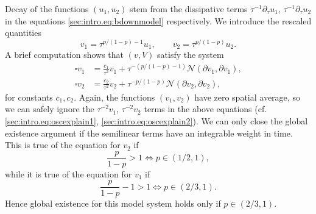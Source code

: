 \documentclass{article}
\newcommand{\mc}{\mathcal}
\newcommand{\pa}{\partial}
\begin{document}
Decay of the functions $(u_1,u_2)$ stem from the dissipative terms $\tau^{-1}\pa_\tau u_1$, $\tau^{-1}\pa_\tau u_2$ in the equations \eqref{sec:intro.eq:bdownmodel} respectively. We introduce the rescaled quantities
\begin{equation}
    v_1 = \tau^{p/(1-p)-1}u_1,\qquad v_2 = \tau^{p/(1-p)}u_2.
\end{equation}
A brief computation shows that $(v,V)$ satisfy the system
\begin{align}
    \square v_1 &= \frac{c_1}{\tau^2}v_1 + \tau^{-(p/(1-p)-1)}\mc{N}(\pa v_1,\pa v_1),\\
    \square v_2 &= \frac{c_2}{\tau^2}v_2 + \tau^{-p/(1-p)}\mc{N}(\pa v_2,\pa v_2),
\end{align}
for constants $c_1,c_2$. Again, the functions $(v_1,v_2)$ have zero spatial average, so we can safely ignore the $\tau^{-2}v_1$, $\tau^{-2}v_2$ terms in the above equations (cf. \eqref{sec:intro.eq:oscexplain1}, \eqref{sec:intro.eq:oscexplain2}). We can only close the global existence argument if the semilinear terms have an integrable weight in time. This is true of the equation for $v_2$ if
\begin{equation}
    \frac{p}{1-p} > 1\iff p\in (1/2,1),
\end{equation}
while it is true of the equation for $v_1$ if
\begin{equation}
    \frac{p}{1-p}-1 > 1 \iff p \in (2/3,1).
\end{equation}
Hence global existence for this model system holds only if $p \in (2/3,1)$.
\end{document}

